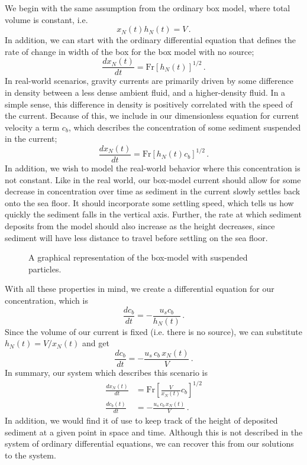 	We begin with the same assumption from the ordinary box model, where total volume is constant, i.e.
	\begin{equation}
		x_N(t)h_N(t) = V \,.
	\end{equation}
	In addition, we can start with the ordinary differential equation that defines the rate of change in width of the box for the box model with no source;
	\begin{equation}
		\frac{dx_N(t)}{dt} = \text{Fr}\left[h_N(t)\right]^{1/2}\,.
	\end{equation}
	In real-world scenarios, gravity currents are primarily driven by some difference in density between a less dense ambient fluid, and a higher-density fluid. In a simple sense,  this difference in density is positively correlated with the speed of the current. Because of this, we include in our dimensionless equation for current velocity a term \(c_b\), which describes the concentration of some sediment suspended in the current;
	\begin{equation}
		\frac{dx_N(t)}{dt} = \text{Fr}\left[h_N(t) c_b\right]^{1/2} \,.
	\end{equation}
	In addition, we wish to model the real-world behavior where this concentration is not constant. Like in the real world, our box-model current should allow for some decrease in concentration over time as sediment in the current slowly settles back onto the sea floor. It should incorporate some settling speed, which tells us how quickly the sediment falls in the vertical axis. Further, the rate at which sediment deposits from the model should also increase as the height decreases, since sediment will have less distance to travel before settling on the sea floor.
	
	\begin{figure}[H]
		\centering
		\caption{A graphical representation of the box-model with suspended particles.}
	\end{figure}

	With all these properties in mind, we create a differential equation for our concentration, which is
	\begin{equation}
		\frac{dc_b}{dt} = - \frac{u_s c_b }{h_N(t)}\,.
	\end{equation}
	Since the volume of our current is fixed (i.e. there is no source), we can substitute \(h_N(t) = V / x_N(t)\) and get
	\begin{equation}
		\frac{dc_b}{dt} = -\frac{u_s \, c_b \, x_N(t)}{V}\,.
	\end{equation}
	In summary, our system which describes this scenario is
	\begin{align}
		\frac{dx_N(t)}{dt} & = \text{Fr} \left[\frac{V }{x_N(t)}c_b\right]^{1/2}\\
		\frac{dc_b(t)}{dt} & = -\frac{u_s \, c_b \, x_N(t)}{V}\,.
	\end{align}
	In addition, we would find it of use to keep track of the height of deposited sediment at a given point in space and time. Although this is not described in the system of ordinary differential equations, we can recover this from our solutions to the system.
	
